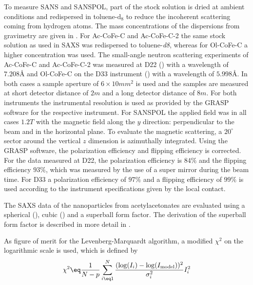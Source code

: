 \documentclass[\main/dresen_thesis.tex]{subfiles}
\begin{document}
    To measure SANS and SANSPOL, part of the stock solution is dried at ambient conditions and redispersed in toluene-$\mathrm{d_8}$ to reduce the incoherent scattering coming from hydrogen atoms.
    The mass concentrations of the dispersions from gravimetry are given in .
    For Ac-CoFe-C and Ac-CoFe-C-2 the same stock solution as used in SAXS was redispersed to toluene-\textit{d8}, whereas for Ol-CoFe-C a higher concentration was used.
    The small-angle neutron scattering experiments of Ac-CoFe-C and Ac-CoFe-C-2 was measured at D22 () with a wavelength of $7.208 \unit{\angstrom}$ and Ol-CoFe-C on the D33 instrument () with a wavelength of $5.998 \unit{\angstrom}$.
    In both cases a sample aperture of $6 \times 10 \unit{mm^2}$ is used and the samples are measured at short detector distance of $2 \unit{m}$ and a long detector distance of $8 \unit{m}$.
    For both instruments the instrumental resolution is used as provided by the GRASP software for the respective instrument.
    For SANSPOL the applied field was in all cases $1.2 \unit{T}$ with the magnetic field along the $y$ direction: perpendicular to the beam and in the horizontal plane.
    To evaluate the magnetic scattering, a $20^\circ$ sector around the vertical $z$ dimension is azimuthally integrated.
    Using the GRASP software, the polarization efficiency and flipping efficiency is corrected.
    For the data measured at D22, the polarization efficiency is $84 \%$ and the flipping efficiency $93 \%$, which was measured by the use of a super mirror during the beam time.
    For D33 a polarization efficiency of $97 \%$ and a flipping efficiency of $99 \%$ is used according to the instrument specifications given by the local contact.

    The SAXS data of the nanoparticles from acetylacetonates are evaluated using a spherical (), cubic () and a superball form factor.
    The derivation of the superball form factor is described in more detail in .

    As figure of merit for the Levenberg-Marquardt algorithm\cite{Marquardt_1963_Analgo, Oliphant_2006_Guide}, a modified $\chi^2$ on the logarithmic scale is used, which is defined by
    \begin{align}
      \chi^2 \eq \frac{1}{N-p} \sum_{i\eq 1}^{N} \frac{(\log(I_i) - \log(I_\mathrm{model}))^2}{\sigma_i^2} I^2_i
    \end{align}
\end{document}
